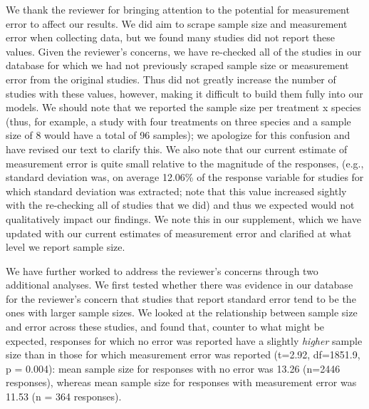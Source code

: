 \documentclass{article}
\begin{document}
We thank the reviewer for bringing attention to the potential for measurement error to affect our results. We did aim to scrape sample size and measurement error when collecting data, but we found many studies did not report these values. Given the reviewer's concerns, we have re-checked all of the studies in our database for which we had not previously scraped sample size or measurement error from the original studies. Thus did not greatly increase the number of studies with these values, however, making it difficult to build them fully into our models. We should note that we reported the sample size per treatment x species (thus, for example, a study with four treatments on three species and a sample size of 8 would have a total of 96 samples); we apologize for this confusion and have revised our text to clarify this. We also note that our current estimate of measurement error is quite small relative to the magnitude of the responses, (e.g., standard deviation was, on average 12.06\% of the response variable for studies for which standard deviation was extracted; note that this value increased sightly with the re-checking all of studies that we did) and thus we expected would not qualitatively impact our findings. We note this in our supplement, which we have updated with our current estimates of measurement error and clarified at what level we report sample size. 

We have further worked to address the reviewer's concerns through two additional analyses. We first tested whether there was evidence in our database for the reviewer's concern that studies that report standard error tend to be the ones with larger sample sizes. We looked at the relationship between sample size and error across these studies, and found that, counter to what might be expected, responses for which no error was reported have a slightly \emph{higher} sample size than in those for which measurement error was reported (t=2.92, df=1851.9, p = 0.004): mean sample size for responses with no error was 13.26 (n=2446 responses), whereas mean sample size for responses with measurement error was 11.53 (n = 364 responses).
\end{document}
